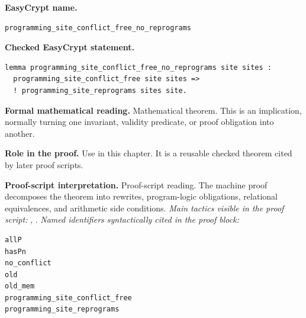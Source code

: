 \begin{formaltheorem}
\noindent\textbf{EasyCrypt name.}
\begin{lstlisting}[language=EasyCrypt,basicstyle=\ttfamily\scriptsize]
programming_site_conflict_free_no_reprograms
\end{lstlisting}
\noindent\textbf{Checked EasyCrypt statement.}
\begin{lstlisting}[language=EasyCrypt,basicstyle=\ttfamily\scriptsize]
lemma programming_site_conflict_free_no_reprograms site sites :
  programming_site_conflict_free site sites =>
  ! programming_site_reprograms sites site.
\end{lstlisting}
\noindent\textbf{Formal mathematical reading.}
Mathematical theorem. This is an implication, normally turning one invariant, validity predicate, or proof obligation into another.

\noindent\textbf{Role in the proof.}
Use in this chapter. It is a reusable checked theorem cited by later proof scripts.

\noindent\textbf{Proof-script interpretation.}
Proof-script reading. The machine proof decomposes the theorem into rewrites, program-logic obligations, relational equivalences, and arithmetic side conditions.
\emph{Main tactics visible in the proof script:} , .
\emph{Named identifiers syntactically cited in the proof block:}
\begin{lstlisting}[language=EasyCrypt,basicstyle=\ttfamily\scriptsize]
allP
hasPn
no_conflict
old
old_mem
programming_site_conflict_free
programming_site_reprograms
\end{lstlisting}

\end{formaltheorem}

